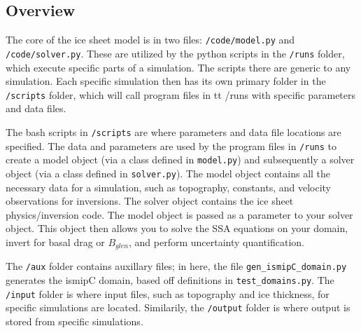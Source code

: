 \documentclass[11pt, reqno, nocenter]{article}
\begin{document}

\subsection{Overview}

The core of the ice sheet model is in two files: {\tt /code/model.py} and {\tt /code/solver.py}. These are utilized by the python scripts in the {\tt /runs} folder, which execute specific parts of a simulation. The scripts there are generic to any simulation. Each specific simulation then has its own primary folder in the {\tt /scripts} folder, which will call program files in {tt /runs} with specific parameters and data files.

The bash scripts in {\tt /scripts} are where parameters and data file locations are specified. The data and parameters are used by the program files in {\tt /runs} to create a model object (via a class defined in {\tt model.py}) and subsequently a solver object (via a class defined in {\tt solver.py}). The model object contains all the necessary data for a simulation, such as topography, constants, and velocity observations for inversions. The solver object contains the ice sheet physics/inversion code. The model object is passed as a parameter to your solver object. This object then allows you to solve the SSA equations on your domain, invert for basal drag or $B_{glen}$, and perform uncertainty quantification. 


The {\tt /aux} folder contains auxillary files; in here, the file {\tt gen\_ismipC\_domain.py} generates the ismipC domain,  based off definitions in {\tt test\_domains.py}. The {\tt /input} folder is where input files, such as topography and ice thickness, for specific simulations are located. Similarily, the {\tt /output} folder is where output is stored from specific simulations.
\end{document}
